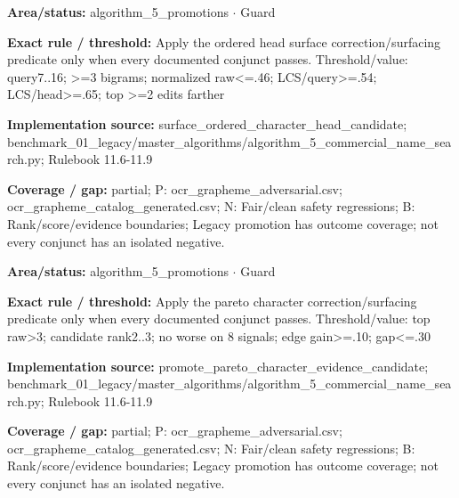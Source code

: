 \begin{tcolorbox}[enhanced,breakable,colback=white,colframe=Muted!45,boxrule=0.45pt,arc=1.5pt,left=6pt,right=6pt,top=5pt,bottom=5pt,title={\texttt{A5-PROMOTE-ORDERED-HEAD-SURFACE}},title after break={\texttt{A5-PROMOTE-ORDERED-HEAD-SURFACE}\ (continued)},fonttitle=\headingfont\bfseries\color{Navy},coltitle=Navy]
\textbf{Area/status:} algorithm\_\allowbreak{}5\_\allowbreak{}promotions $\boldsymbol{\cdot}$ Guard\par
\smallskip
\textbf{Exact rule / threshold:} Apply the ordered head surface correction/\allowbreak{}surfacing predicate only when every documented conjunct passes. Threshold/\allowbreak{}value: query7..16; >=3 bigrams; normalized raw<=.46; LCS/\allowbreak{}query>=.54; LCS/\allowbreak{}head>=.65; top >=2 edits farther\par
\smallskip
\textbf{Implementation source:} surface\_\allowbreak{}ordered\_\allowbreak{}character\_\allowbreak{}head\_\allowbreak{}candidate; benchmark\_\allowbreak{}01\_\allowbreak{}legacy/\allowbreak{}master\_\allowbreak{}algorithms/\allowbreak{}algorithm\_\allowbreak{}5\_\allowbreak{}commercial\_\allowbreak{}name\_\allowbreak{}search.py; Rulebook 11.6-11.9\par
\smallskip
\textbf{Coverage / gap:} partial; P: ocr\_\allowbreak{}grapheme\_\allowbreak{}adversarial.csv; ocr\_\allowbreak{}grapheme\_\allowbreak{}catalog\_\allowbreak{}generated.csv; N: Fair/\allowbreak{}clean safety regressions; B: Rank/\allowbreak{}score/\allowbreak{}evidence boundaries; Legacy promotion has outcome coverage; not every conjunct has an isolated negative.
\end{tcolorbox}
\begin{tcolorbox}[enhanced,breakable,colback=white,colframe=Muted!45,boxrule=0.45pt,arc=1.5pt,left=6pt,right=6pt,top=5pt,bottom=5pt,title={\texttt{A5-PROMOTE-PARETO-CHARACTER}},title after break={\texttt{A5-PROMOTE-PARETO-CHARACTER}\ (continued)},fonttitle=\headingfont\bfseries\color{Navy},coltitle=Navy]
\textbf{Area/status:} algorithm\_\allowbreak{}5\_\allowbreak{}promotions $\boldsymbol{\cdot}$ Guard\par
\smallskip
\textbf{Exact rule / threshold:} Apply the pareto character correction/\allowbreak{}surfacing predicate only when every documented conjunct passes. Threshold/\allowbreak{}value: top raw>3; candidate rank2..3; no worse on 8 signals; edge gain>=.10; gap<=.30\par
\smallskip
\textbf{Implementation source:} promote\_\allowbreak{}pareto\_\allowbreak{}character\_\allowbreak{}evidence\_\allowbreak{}candidate; benchmark\_\allowbreak{}01\_\allowbreak{}legacy/\allowbreak{}master\_\allowbreak{}algorithms/\allowbreak{}algorithm\_\allowbreak{}5\_\allowbreak{}commercial\_\allowbreak{}name\_\allowbreak{}search.py; Rulebook 11.6-11.9\par
\smallskip
\textbf{Coverage / gap:} partial; P: ocr\_\allowbreak{}grapheme\_\allowbreak{}adversarial.csv; ocr\_\allowbreak{}grapheme\_\allowbreak{}catalog\_\allowbreak{}generated.csv; N: Fair/\allowbreak{}clean safety regressions; B: Rank/\allowbreak{}score/\allowbreak{}evidence boundaries; Legacy promotion has outcome coverage; not every conjunct has an isolated negative.
\end{tcolorbox}
